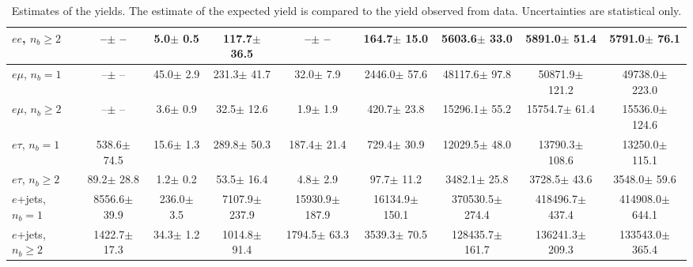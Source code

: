 \begin{sidewaystable}[p]
\begin{tabular}{l|cccccc|cc}
    $e e$, $n_b\geq2$                  &       --$\pm$     -- &      5.0$\pm$    0.5 &    117.7$\pm$   36.5 &       --$\pm$     -- &    164.7$\pm$   15.0 &   5603.6$\pm$   33.0 &   5891.0$\pm$   51.4 &   5791.0$\pm$   76.1 \\ 
    \hline
    $e\mu$, $n_b=1$                    &       --$\pm$     -- &     45.0$\pm$    2.9 &    231.3$\pm$   41.7 &     32.0$\pm$    7.9 &   2446.0$\pm$   57.6 &  48117.6$\pm$   97.8 &  50871.9$\pm$  121.2 &  49738.0$\pm$  223.0 \\ 
    $e\mu$, $n_b\geq2$                 &       --$\pm$     -- &      3.6$\pm$    0.9 &     32.5$\pm$   12.6 &      1.9$\pm$    1.9 &    420.7$\pm$   23.8 &  15296.1$\pm$   55.2 &  15754.7$\pm$   61.4 &  15536.0$\pm$  124.6 \\ 
    \hline
    $e\tau$, $n_b=1$                   &    538.6$\pm$   74.5 &     15.6$\pm$    1.3 &    289.8$\pm$   50.3 &    187.4$\pm$   21.4 &    729.4$\pm$   30.9 &  12029.5$\pm$   48.0 &  13790.3$\pm$  108.6 &  13250.0$\pm$  115.1 \\ 
    $e\tau$, $n_b\geq2$                &     89.2$\pm$   28.8 &      1.2$\pm$    0.2 &     53.5$\pm$   16.4 &      4.8$\pm$    2.9 &     97.7$\pm$   11.2 &   3482.1$\pm$   25.8 &   3728.5$\pm$   43.6 &   3548.0$\pm$   59.6 \\ 
    \hline
    $e$+jets, $n_b=1$                  &   8556.6$\pm$   39.9 &    236.0$\pm$    3.5 &   7107.9$\pm$  237.9 &  15930.9$\pm$  187.9 &  16134.9$\pm$  150.1 & 370530.5$\pm$  274.4 & 418496.7$\pm$  437.4 & 414908.0$\pm$  644.1 \\ 
    $e$+jets, $n_b\geq2$               &   1422.7$\pm$   17.3 &     34.3$\pm$    1.2 &   1014.8$\pm$   91.4 &   1794.5$\pm$   63.3 &   3539.3$\pm$   70.5 & 128435.7$\pm$  161.7 & 136241.3$\pm$  209.3 & 133543.0$\pm$  365.4 \\ 
    \hline

    \end{tabular}
    \caption{Estimates of the yields. The estimate of the expected yield is compared to
    the yield observed from data.  Uncertainties are statistical only.
    \label{tab:yields}}
\end{sidewaystable}
